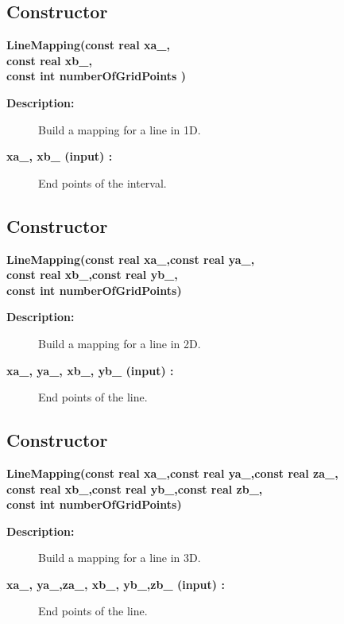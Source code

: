 \subsection{Constructor}
 
\newlength{\LineMappingIncludeArgIndent}
\begin{flushleft} \textbf{%
\settowidth{\LineMappingIncludeArgIndent}{LineMapping(}%
LineMapping(const real xa\_, \\ 
\hspace{\LineMappingIncludeArgIndent}const real xb\_, \\ 
\hspace{\LineMappingIncludeArgIndent}const int numberOfGridPoints )
}\end{flushleft}
\begin{description}
\item[{\bf Description:}]  Build a mapping for a line in 1D.
\item[{\bf xa\_, xb\_ (input) :}]  End points of the interval.
\end{description}
\subsection{Constructor}
 
\begin{flushleft} \textbf{%
\settowidth{\LineMappingIncludeArgIndent}{LineMapping(}%
LineMapping(const real xa\_,const real ya\_, \\ 
\hspace{\LineMappingIncludeArgIndent}const real xb\_,const real yb\_,\\ 
\hspace{\LineMappingIncludeArgIndent}const int numberOfGridPoints)
}\end{flushleft}
\begin{description}
\item[{\bf Description:}]  Build a mapping for a line in 2D.
\item[{\bf xa\_, ya\_, xb\_, yb\_ (input) :}]  End points of the line.
\end{description}
\subsection{Constructor}
 
\begin{flushleft} \textbf{%
\settowidth{\LineMappingIncludeArgIndent}{LineMapping(}%
LineMapping(const real xa\_,const real ya\_,const real za\_, \\ 
\hspace{\LineMappingIncludeArgIndent}const real xb\_,const real yb\_,const real zb\_,\\ 
\hspace{\LineMappingIncludeArgIndent}const int numberOfGridPoints)
}\end{flushleft}
\begin{description}
\item[{\bf Description:}]  Build a mapping for a line in 3D.
\item[{\bf xa\_, ya\_,za\_,  xb\_, yb\_,zb\_ (input) :}]  End points of the line.
\end{description}
